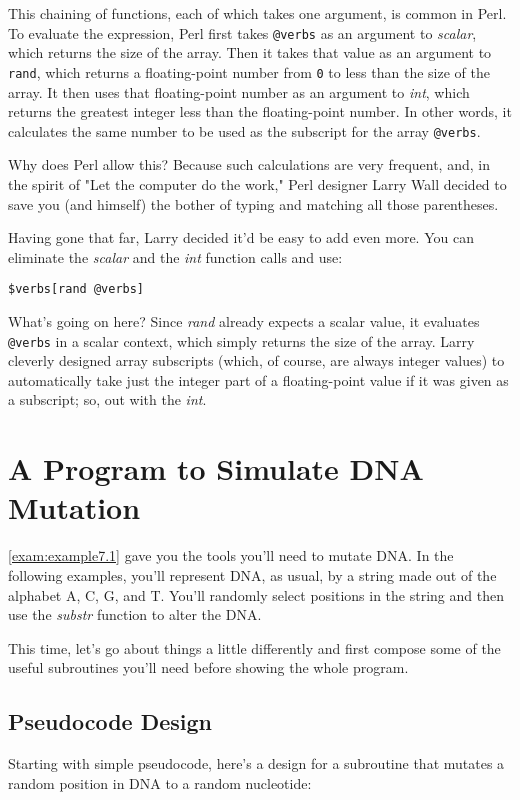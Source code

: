 This chaining of functions, each of which takes one argument, is common in Perl. To evaluate the expression, Perl first takes \verb|@verbs| as an argument to \textit{scalar}, which returns the size of the array. Then it takes that value as an argument to \verb|rand|, which returns a floating-point number from \verb|0| to less than the size of the array. It then uses that floating-point number as an argument to \textit{int}, which returns the greatest integer less than the floating-point number. In other words, it calculates the same number to be used as the subscript for the array \verb|@verbs|.

Why does Perl allow this? Because such calculations are very frequent, and, in the spirit of "Let the computer do the work," Perl designer Larry Wall decided to save you (and himself) the bother of typing and matching all those parentheses.

Having gone that far, Larry decided it'd be easy to add even more. You can eliminate the \textit{scalar} and the \textit{int} function calls and use:

\begin{lstlisting}
$verbs[rand @verbs]
\end{lstlisting}

What's going on here? Since \textit{rand} already expects a scalar value, it evaluates \verb|@verbs| in a scalar context, which simply returns the size of the array. Larry cleverly designed array subscripts (which, of course, are always integer values) to automatically take just the integer part of a floating-point value if it was given as a subscript; so, out with the \textit{int}. 

\section{A Program to Simulate DNA Mutation}
\autoref{exam:example7.1} gave you the tools you'll need to mutate DNA. In the following examples, you'll represent DNA, as usual, by a string made out of the alphabet A, C, G, and T. You'll randomly select positions in the string and then use the \textit{substr} function to alter the DNA.

This time, let's go about things a little differently and first compose some of the useful subroutines you'll need before showing the whole program. 

\subsection{Pseudocode Design}
Starting with simple pseudocode, here's a design for a subroutine that mutates a random position in DNA to a random nucleotide:

